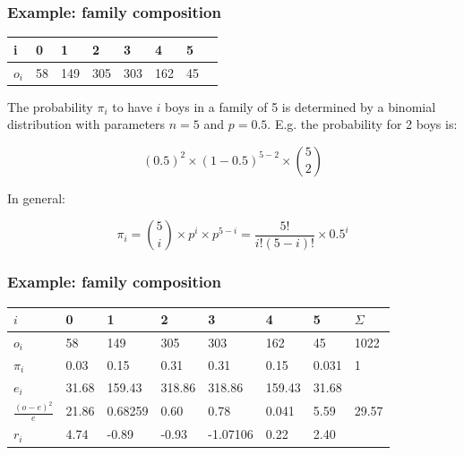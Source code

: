 \documentclass{beamer}
\begin{document}
\begin{frame}
  \frametitle{Example: family composition}
  \begin{table}[h]
\begin{tabular}{@{}llllllll@{}}
\toprule
i       & 0  & 1   & 2   & 3   & 4   & 5  &  \\ \midrule
$o_{i}$ & 58 & 149 & 305 & 303 & 162 & 45 &  \\ \bottomrule
\end{tabular}
\end{table}
\pause
The probability $\pi_{i}$ to have $i$ boys in a family of 5 is determined by a binomial distribution with parameters $n=5$ and $p=0.5$. E.g. the probability for 2 boys is:

\[ (0.5)^{2} \times (1-0.5)^{5-2} \times \binom{5}{2} \]

In general:

\[ \pi_{i} = \binom{5}{i}\times p^{i} \times p^{5-i} = \frac{5!}{i!(5-i)!}\times 0.5^{i} \]
\end{frame}

\begin{frame}
  \frametitle{Example: family composition}
  \begin{table}[h]
\begin{tabular}{@{}llllllll@{}}
\toprule
$i$                         & 0        & 1        & 2        & 3        & 4       & 5       & $\Sigma$\\ \midrule
$o_i$                      & 58       & 149      & 305      & 303      & 162     & 45      & 1022    \\
$\pi_i$                      & 0.03    & 0.15    & 0.31    & 0.31  & 0.15 & 0.031 & 1       \\
$e_i$                      & 31.68   & 159.43  & 318.86  & 318.86  & 159.43 & 31.68  &         \\
$\frac{(o-e)^{2}}{e}$ & 21.86 & 0.68259  & 0.60   & 0.78  & 0.041 & 5.59 & 29.57 \\
$r_i$                      & 4.74   & -0.89 & -0.93 & -1.07106 & 0.22 & 2.40 &         \\ \bottomrule
\end{tabular}
\end{table}
\end{frame}
\end{document}
